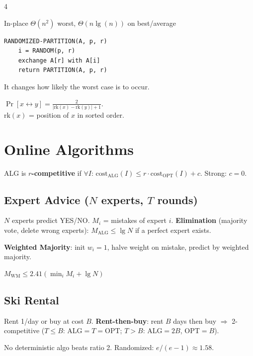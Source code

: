 \documentclass[8pt,a4paper,landscape]{extarticle}
\begin{document}
\begin{multicols*}{4}
\begin{prop}[title=Runtime]
In-place $\Theta(n^2)$ worst, $\Theta(n\lg(n))$ on best/average
\end{prop}

\begin{lstlisting}
RANDOMIZED-PARTITION(A, p, r)
    i = RANDOM(p, r)
    exchange A[r] with A[i]
    return PARTITION(A, p, r)
\end{lstlisting}
It changes how likely the worst case is to occur.

\begin{prop}[title=Probability x compared to y]
$\Pr[x \leftrightarrow y] = \frac{2}{|\text{rk}(x)-\text{rk}(y)|+1}$.\\
$\text{rk}(x)$ = position of $x$ in sorted order.
\end{prop}

\section{Online Algorithms}

\begin{defn}[title=Competitive Ratio]
ALG is \textbf{$r$-competitive} if $\forall I$: $\text{cost}_\text{ALG}(I) \leq r \cdot \text{cost}_\text{OPT}(I) + c$. Strong: $c=0$.
\end{defn}

\subsection{Expert Advice ($N$ experts, $T$ rounds)}
$N$ experts predict YES/NO. $M_i$ = mistakes of expert $i$. \textbf{Elimination} (majority vote, delete wrong experts): $M_\text{ALG} \leq \lg N$ if a perfect expert exists.

\textbf{Weighted Majority}: init $w_i=1$, halve weight on mistake, predict by weighted majority.
\begin{thm}
$M_\text{WM} \leq 2.41(\min_i M_i + \lg N)$
\end{thm}

\subsection{Ski Rental}
Rent 1/day or buy at cost $B$. \textbf{Rent-then-buy}: rent $B$ days then buy $\Rightarrow$ 2-competitive ($T\leq B$: ALG$=T=$OPT; $T>B$: ALG$=2B$, OPT$=B$).
\begin{thm}
No deterministic algo beats ratio 2. Randomized: $e/(e{-}1)\approx1.58$.
\end{thm}


\end{multicols*}
\end{document}
